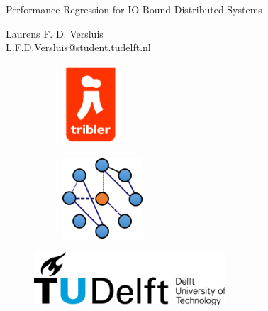 \begin{titlepage}

\null\vfill

\begin{center}
\LARGE{Performance Regression for IO-Bound Distributed Systems}
\end{center}

\vspace{1.5cm}

\begin{center}
Laurens F. D. Versluis\\
L.F.D.Versluis@student.tudelft.nl
\end{center}

\vfill

\centering
\begin{figure}[!b]
\captionsetup[subfigure]{labelformat=empty}
\begin{subfigure}{0.4\textwidth}
\centering
\includegraphics[height=3cm]{pics/triblerlogo}
\caption{}
\end{subfigure}%
\begin{subfigure}{0.6\textwidth}
\centering
\includegraphics[height=3cm]{pics/dslogo}
\caption{}
\end{subfigure}%
\end{figure}

\begin{figure}[!b]
\centering
\includegraphics[height=2cm]{pics/TUDLogo}
\end{figure}


\vspace{2.0cm}

\end{titlepage}
